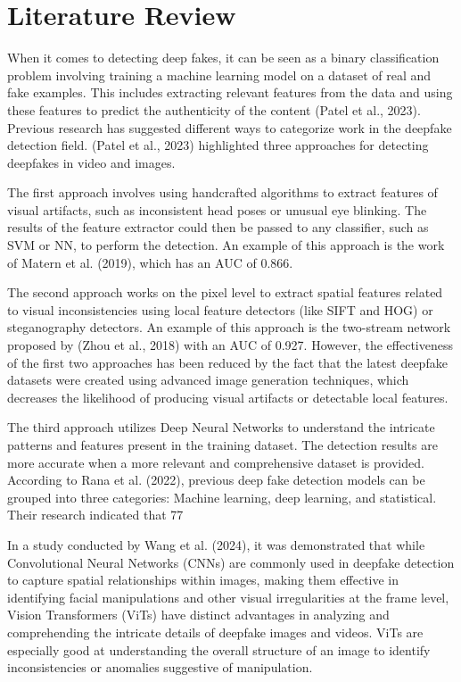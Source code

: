 \documentclass{svproc}
\begin{document}
\section{Literature Review}

When it comes to detecting deep fakes, it can be seen as a binary classification problem involving training a machine learning model on a dataset of real and fake examples. This includes extracting relevant features from the data and using these features to predict the authenticity of the content (Patel et al., 2023). Previous research has suggested different ways to categorize work in the deepfake detection field. (Patel et al., 2023) highlighted three approaches for detecting deepfakes in video and images.

The first approach involves using handcrafted algorithms to extract features of visual artifacts, such as inconsistent head poses or unusual eye blinking. The results of the feature extractor could then be passed to any classifier, such as SVM or NN, to perform the detection. An example of this approach is the work of Matern et al. (2019), which has an AUC of 0.866.

The second approach works on the pixel level to extract spatial features related to visual inconsistencies using local feature detectors (like SIFT and HOG) or steganography detectors. An example of this approach is the two-stream network proposed by (Zhou et al., 2018) with an AUC of 0.927. However, the effectiveness of the first two approaches has been reduced by the fact that the latest deepfake datasets were created using advanced image generation techniques, which decreases the likelihood of producing visual artifacts or detectable local features.

The third approach utilizes Deep Neural Networks to understand the intricate patterns and features present in the training dataset. The detection results are more accurate when a more relevant and comprehensive dataset is provided. According to Rana et al. (2022), previous deep fake detection models can be grouped into three categories: Machine learning, deep learning, and statistical. Their research indicated that 77%

In a study conducted by Wang et al. (2024), it was demonstrated that while Convolutional Neural Networks (CNNs) are commonly used in deepfake detection to capture spatial relationships within images, making them effective in identifying facial manipulations and other visual irregularities at the frame level, Vision Transformers (ViTs) have distinct advantages in analyzing and comprehending the intricate details of deepfake images and videos. ViTs are especially good at understanding the overall structure of an image to identify inconsistencies or anomalies suggestive of manipulation.
\end{document}
